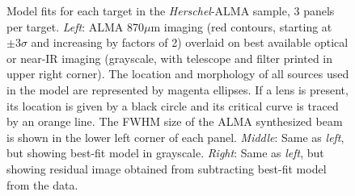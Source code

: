 \documentclass[iop]{emulateapj}
\begin{document}
\begin{figure}[!tbp]
\caption{ Model fits for each target in the {\it Herschel}-ALMA sample, 3
panels per target.  {\it Left}: ALMA 870$\mu$m imaging (red contours, starting
at $\pm 3\sigma$ and increasing by factors of 2) overlaid on best available
optical or near-IR imaging (grayscale, with telescope and filter printed in
upper right corner).  The location and morphology of all sources used in the
model are represented by magenta ellipses.  If a lens is present, its location
is given by a black circle and its critical curve is traced by an orange line.
The FWHM size of the ALMA synthesized beam is shown in the lower left corner of
each panel.  {\it Middle}: Same as {\it left}, but showing best-fit model in
grayscale.  {\it Right}: Same as {\it left}, but showing residual image
obtained from subtracting best-fit model from the data.  \label{fig:uvmodels}}
\addtocounter{figure}{-1}

\end{figure}
\end{document}
